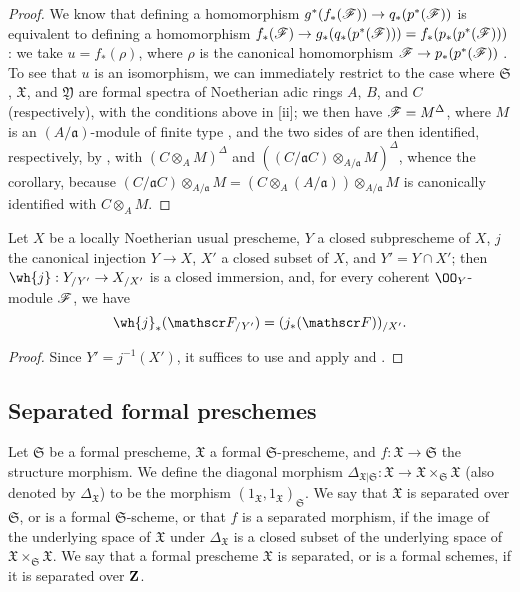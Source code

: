 \begin{proof}
\label{proof-1.10.14.6}
We know that defining a homomorphism $g^*(f_*(\sh{F})) \to q_*(p^*(\sh{F}))$ is equivalent to defining a homomorphism $f_*(\sh{F}) \to g_*(q_*(p^*(\sh{F}))) = f_*(p_*(p^*(\sh{F})))$ :
we take $u=f_*(\rho)$, where $\rho$ is the canonical homomorphism $\sh{F}\to p_*(p^*(\sh{F}))$ .
To see that $u$ is an isomorphism, we can immediately restrict to the case where $\mathfrak{S}$, $\mathfrak{X}$, and $\mathfrak{Y}$ are formal spectra of Noetherian adic rings $A$, $B$, and $C$ (respectively), with the conditions above in [ii];
we then have $\mathscr{F}=M^\Delta$, where $M$ is an $(A/\mathfrak{a})$-module of finite type , and the two sides of  are then identified, respectively, by , with $(C\otimes_A M)^\Delta$ and $((C/\mathfrak{a}C)\otimes_{A/\mathfrak{a}}M)^\Delta$, whence the corollary, because $(C/\mathfrak{a}C)\otimes_{A/\mathfrak{a}}M = (C\otimes_A(A/\mathfrak{a}))\otimes_{A/\mathfrak{a}}M$ is canonically identified with $C\otimes_A M$.
\end{proof}

\begin{cor}[10.14.7]
\label{1.10.14.7}
Let $X$ be a locally Noetherian usual prescheme, $Y$ a closed subprescheme of $X$, $j$ the canonical injection $Y\to X$, $X'$ a closed subset of $X$, and $Y'=Y\cap X'$;
then $\wh{j}:Y_{/Y'}\to X_{/X'}$ is a closed immersion, and, for every coherent $\OO_Y$-module $\mathscr{F}$, we have
\[
    \wh{j}_*(\sh{F}_{/Y'}) = (j_*(\sh{F}))_{/X'}.
\]
\end{cor}

\begin{proof}
\label{proof-1.10.14.7}
Since $Y'=j^{-1}(X')$, it suffices to use  and apply  and .
\end{proof}

\subsection{Separated formal preschemes}
\label{subsection:1.10.15}

\begin{defn}[10.15.1]
\label{1.10.15.1}
Let $\mathfrak{S}$ be a formal prescheme, $\mathfrak{X}$ a formal $\mathfrak{S}$-prescheme, and $f:\mathfrak{X}\to\mathfrak{S}$ the structure morphism.
We define the diagonal morphism $\Delta_{\mathfrak{X}|\mathfrak{S}}:\mathfrak{X}\to\mathfrak{X}\times_\mathfrak{S}\mathfrak{X}$ (also denoted by $\Delta_\mathfrak{X}$) to be the morphism $(1_\mathfrak{X},1_\mathfrak{X})_\mathfrak{S}$.
We say that $\mathfrak{X}$ is separated over $\mathfrak{S}$, or is a formal $\mathfrak{S}$-scheme, or that $f$ is a separated morphism, if the image of the underlying space of $\mathfrak{X}$ under $\Delta_\mathfrak{X}$ is a closed subset of the underlying space of $\mathfrak{X}\times_\mathfrak{S}\mathfrak{X}$.
We say that a formal prescheme $\mathfrak{X}$ is separated, or is a formal schemes, if it is separated over $\mathbf{Z}$.
\end{defn}

